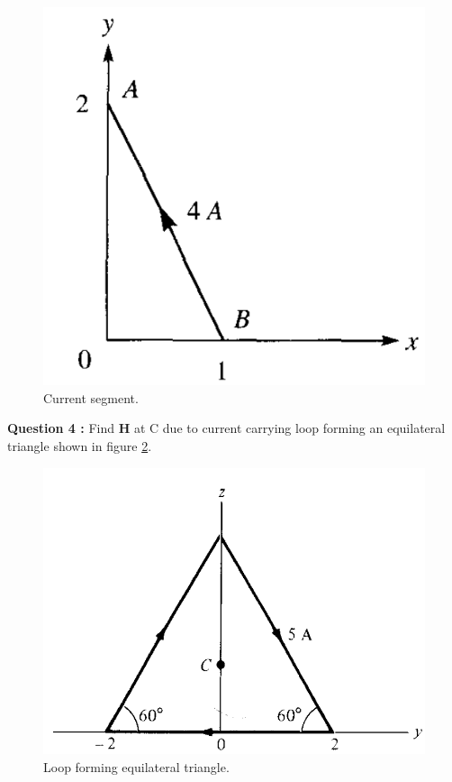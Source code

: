 \documentclass[12pt,a4paper]{article}
\begin{document}
\begin{figure}[H]
\centering
\includegraphics[scale=0.4]{Figure7-27S.png}
\caption{Current segment.}
\label{AB-segment2}
\end{figure}
\noindent\textbf{Question 4 \cite[Problem 7.8, page 298]{Sadiku}:} Find \textbf{H} at C due to current carrying loop forming an equilateral triangle shown in figure \ref{equilateral-wires}.\\
\begin{figure}[H]
\centering
\includegraphics[scale=0.4]{Figure7-29S.png}
\caption{Loop forming equilateral triangle.}
\label{equilateral-wires}
\end{figure}
\end{document}
